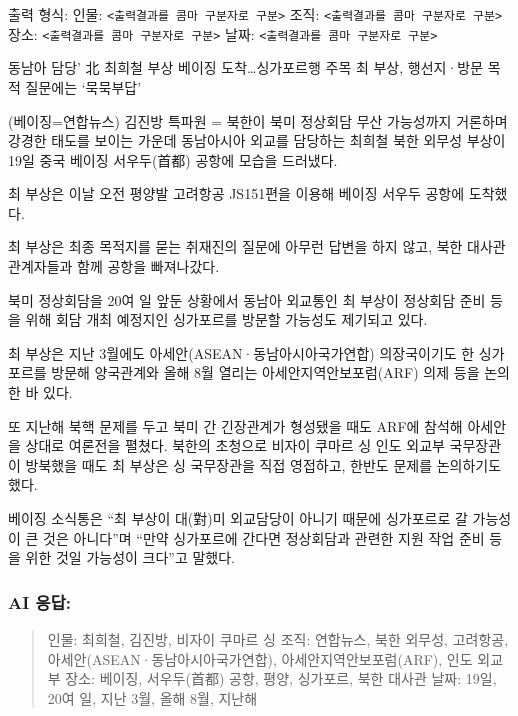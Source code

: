 \documentclass[
  letterpaper,
]{book}
\begin{document}
\begin{tcolorbox}[enhanced jigsaw, opacityback=0, opacitybacktitle=0.6, colback=white, rightrule=.15mm, coltitle=black, colframe=quarto-callout-note-color-frame, colbacktitle=quarto-callout-note-color!10!white, bottomrule=.15mm, bottomtitle=1mm, breakable, title=\textcolor{quarto-callout-note-color}{\faInfo}\hspace{0.5em}{프롬프트: 다음 뉴스기사에서 개체명을 추출해 주세요.}, titlerule=0mm, leftrule=.75mm, toptitle=1mm, left=2mm, arc=.35mm, toprule=.15mm]

출력 형식: 인물:
\texttt{\textless{}출력결과를\ 콤마\ 구분자로\ 구분\textgreater{}} 조직:
\texttt{\textless{}출력결과를\ 콤마\ 구분자로\ 구분\textgreater{}} 장소:
\texttt{\textless{}출력결과를\ 콤마\ 구분자로\ 구분\textgreater{}} 날짜:
\texttt{\textless{}출력결과를\ 콤마\ 구분자로\ 구분\textgreater{}}

동남아 담당' 北 최희철 부상 베이징 도착\ldots 싱가포르행 주목 최 부상,
행선지·방문 목적 질문에는 `묵묵부답'

(베이징=연합뉴스) 김진방 특파원 = 북한이 북미 정상회담 무산 가능성까지
거론하며 강경한 태도를 보이는 가운데 동남아시아 외교를 담당하는 최희철
북한 외무성 부상이 19일 중국 베이징 서우두(首都) 공항에 모습을 드러냈다.

최 부상은 이날 오전 평양발 고려항공 JS151편을 이용해 베이징 서우두
공항에 도착했다.

최 부상은 최종 목적지를 묻는 취재진의 질문에 아무런 답변을 하지 않고,
북한 대사관 관계자들과 함께 공항을 빠져나갔다.

북미 정상회담을 20여 일 앞둔 상황에서 동남아 외교통인 최 부상이 정상회담
준비 등을 위해 회담 개최 예정지인 싱가포르를 방문할 가능성도 제기되고
있다.

최 부상은 지난 3월에도 아세안(ASEAN·동남아시아국가연합) 의장국이기도 한
싱가포르를 방문해 양국관계와 올해 8월 열리는 아세안지역안보포럼(ARF)
의제 등을 논의한 바 있다.

또 지난해 북핵 문제를 두고 북미 간 긴장관계가 형성됐을 때도 ARF에 참석해
아세안을 상대로 여론전을 펼쳤다. 북한의 초청으로 비자이 쿠마르 싱 인도
외교부 국무장관이 방북했을 때도 최 부상은 싱 국무장관을 직접 영접하고,
한반도 문제를 논의하기도 했다.

베이징 소식통은 ``최 부상이 대(對)미 외교담당이 아니기 때문에 싱가포르로
갈 가능성이 큰 것은 아니다''며 ``만약 싱가포르에 간다면 정상회담과
관련한 지원 작업 준비 등을 위한 것일 가능성이 크다''고 말했다.

\hypertarget{ai-uxc751uxb2f5-6}{%
\subsubsection*{AI 응답:}\label{ai-uxc751uxb2f5-6}}

\begin{quote}
인물: 최희철, 김진방, 비자이 쿠마르 싱 조직: 연합뉴스, 북한 외무성,
고려항공, 아세안(ASEAN·동남아시아국가연합), 아세안지역안보포럼(ARF),
인도 외교부 장소: 베이징, 서우두(首都) 공항, 평양, 싱가포르, 북한 대사관
날짜: 19일, 20여 일, 지난 3월, 올해 8월, 지난해
\end{quote}

\end{tcolorbox}
\end{document}
